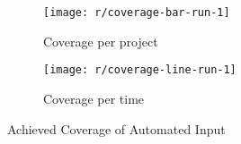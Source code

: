 %

\begin{figure}[htpb]
    \centering
    \begin{subfigure}{.90\textwidth}
        \texttt{[image: r/coverage-bar-run-1]}
        \caption{Coverage per project}
        \label{fig:coverage_bar}
    \end{subfigure}

    \bigskip

    \begin{subfigure}{.90\textwidth}
        \texttt{[image: r/coverage-line-run-1]}
        \caption{Coverage per time}
        \label{fig:coverage_line}
    \end{subfigure}
    \caption{Achieved Coverage of Automated Input}
    \label{fig:coverage}
\end{figure}


